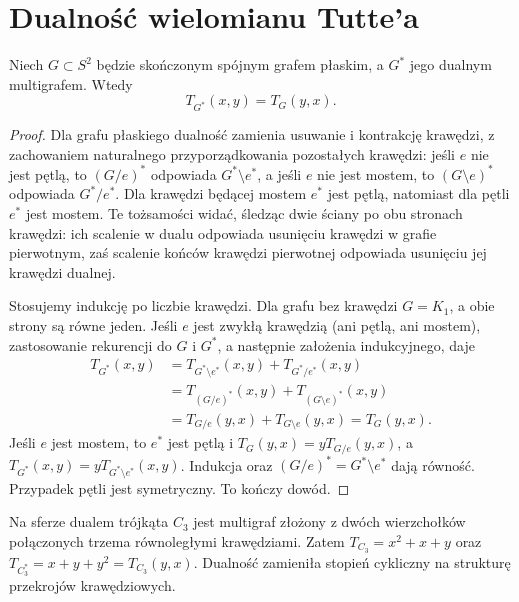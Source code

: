 \section{Dualność wielomianu Tutte'a}
\label{sec:tg-tutte-duality}

\begin{twierdzenie}
\label{thm:tg-tutte-dual}
Niech $G\subset S^2$ będzie skończonym spójnym grafem
płaskim, a $G^*$ jego dualnym multigrafem. Wtedy
\[
 T_{G^*}(x,y)=T_G(y,x).
\]
\end{twierdzenie}

\begin{proof}
Dla grafu płaskiego dualność zamienia usuwanie i kontrakcję
krawędzi, z zachowaniem naturalnego przyporządkowania
pozostałych krawędzi: jeśli $e$ nie jest pętlą, to
$(G/e)^*$ odpowiada $G^*\setminus e^*$, a jeśli $e$
nie jest mostem, to $(G\setminus e)^*$ odpowiada
$G^*/e^*$. Dla krawędzi będącej mostem $e^*$ jest
pętlą, natomiast dla pętli $e^*$ jest mostem.
Te tożsamości widać, śledząc dwie ściany po obu
stronach krawędzi: ich scalenie w dualu odpowiada
usunięciu krawędzi w grafie pierwotnym, zaś
scalenie końców krawędzi pierwotnej odpowiada
usunięciu jej krawędzi dualnej.

Stosujemy indukcję po liczbie krawędzi. Dla grafu
bez krawędzi $G=K_1$, a obie strony są równe jeden.
Jeśli $e$ jest zwykłą krawędzią (ani pętlą,
ani mostem), zastosowanie rekurencji do $G$ i $G^*$,
a następnie założenia indukcyjnego, daje
\[
\begin{aligned}
T_{G^*}(x,y)
 &=T_{G^*\setminus e^*}(x,y)+T_{G^*/e^*}(x,y)\\
 &=T_{(G/e)^*}(x,y)+T_{(G\setminus e)^*}(x,y)\\
 &=T_{G/e}(y,x)+T_{G\setminus e}(y,x)=T_G(y,x).
\end{aligned}
\]
Jeśli $e$ jest mostem, to $e^*$ jest pętlą i
$T_G(y,x)=yT_{G/e}(y,x)$, a
$T_{G^*}(x,y)=yT_{G^*\setminus e^*}(x,y)$.
Indukcja oraz $(G/e)^*=G^*\setminus e^*$ dają równość.
Przypadek pętli jest symetryczny. To kończy dowód.
\end{proof}

\begin{przyklad}
Na sferze dualem trójkąta $C_3$ jest multigraf złożony
z dwóch wierzchołków połączonych trzema równoległymi
krawędziami. Zatem
$T_{C_3}=x^2+x+y$ oraz
$T_{C_3^*}=x+y+y^2=T_{C_3}(y,x)$.
Dualność zamieniła stopień cykliczny na strukturę
przekrojów krawędziowych.
\end{przyklad}

